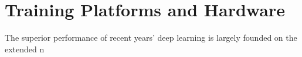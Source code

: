 \section{Training Platforms and Hardware}
The superior performance of recent years' deep learning is largely founded on the extended n